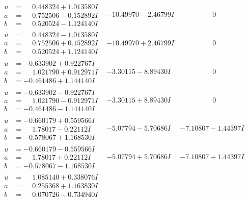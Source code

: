 \documentclass[1p]{elsarticle_modified}
\theoremstyle{definition}
\begin{document}
$$\begin{array}{c|c|c}
\begin{aligned}
u &= \phantom{-}0.448324 + 1.013580 I \\
a &= \phantom{-}0.752506 - 0.152892 I \\
b &= \phantom{-}0.520524 - 1.124140 I\end{aligned}
 & -10.49970 - 2.46799 I & \phantom{-0.000000 } 0 \\ \hline\begin{aligned}
u &= \phantom{-}0.448324 - 1.013580 I \\
a &= \phantom{-}0.752506 + 0.152892 I \\
b &= \phantom{-}0.520524 + 1.124140 I\end{aligned}
 & -10.49970 + 2.46799 I & \phantom{-0.000000 } 0 \\ \hline\begin{aligned}
u &= -0.633902 + 0.922767 I \\
a &= \phantom{-}1.021790 + 0.912971 I \\
b &= -0.461486 + 1.144140 I\end{aligned}
 & -3.30115 - 8.89430 I & \phantom{-0.000000 } 0 \\ \hline\begin{aligned}
u &= -0.633902 - 0.922767 I \\
a &= \phantom{-}1.021790 - 0.912971 I \\
b &= -0.461486 - 1.144140 I\end{aligned}
 & -3.30115 + 8.89430 I & \phantom{-0.000000 } 0 \\ \hline\begin{aligned}
u &= -0.660179 + 0.559566 I \\
a &= \phantom{-}1.78017 - 0.22112 I \\
b &= -0.578067 + 1.168530 I\end{aligned}
 & -5.07794 - 5.70686 I & -7.10807 - 1.44397 I \\ \hline\begin{aligned}
u &= -0.660179 - 0.559566 I \\
a &= \phantom{-}1.78017 + 0.22112 I \\
b &= -0.578067 - 1.168530 I\end{aligned}
 & -5.07794 + 5.70686 I & -7.10807 + 1.44397 I \\ \hline\begin{aligned}
u &= \phantom{-}1.085140 + 0.338076 I \\
a &= \phantom{-}0.255368 + 1.163830 I \\
b &= \phantom{-}0.070726 - 0.734940 I\end{aligned}

\end{array}$$
\end{document}
